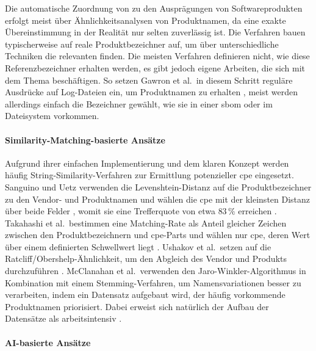 Die automatische Zuordnung von  zu den Ausprägungen von Softwareprodukten erfolgt meist über Ähnlichkeitsanalysen von Produktnamen, da eine exakte Übereinstimmung in der Realität nur selten zuverlässig ist.
Die Verfahren bauen typischerweise auf reale Produktbezeichner auf, um über unterschiedliche Techniken die relevanten  finden.
Die meisten Verfahren definieren nicht, wie diese Referenzbezeichner erhalten werden, es gibt jedoch eigene Arbeiten, die sich mit dem Thema beschäftigen.
So setzen Gawron et al.\ in diesem Schritt reguläre Ausdrücke auf Log-Dateien ein, um Produktnamen zu erhalten \autocite{Gawron2017}, meist werden allerdings einfach die Bezeichner gewählt, wie sie in einer \acrshort{sbom} oder im Dateisystem vorkommen.

\paragraph{Similarity-Matching-basierte Ansätze}

Aufgrund ihrer einfachen Implementierung und dem klaren Konzept werden häufig String-Similarity-Verfahren zur Ermittlung potenzieller \acrshort{cpe} eingesetzt.
Sanguino und Uetz verwenden die Levenshtein-Distanz auf die Produktbezeichner zu den Vendor- und Produktnamen und wählen die \acrshort{cpe} mit der kleinsten Distanz über beide Felder \autocite{Sanguino_Uetz_2017}, womit sie eine Trefferquote von etwa $83\,\%$ erreichen \autocite{Idrissi_Sebai_Faroukhi_Mahouachi_2024}.
Takahashi et al.\ bestimmen eine Matching-Rate als Anteil gleicher Zeichen zwischen den Produktbezeichnern und \acrshort{cpe}-Parts und wählen nur \acrshort{cpe}, deren Wert über einem definierten Schwellwert liegt \autocite{Takahashi_Miyamoto_Nakao_2016}.
Ushakov et al.\ setzen auf die Ratcliff/Obershelp-Ähnlichkeit, um den Abgleich des Vendor und Produkts durchzuführen \autocite{Ushakov_Doynikova_Novikova_Kotenko_2021}.
McClanahan et al.\ verwenden den Jaro-Winkler-Algorithmus in Kombination mit einem Stemming-Verfahren, um Namensvariationen besser zu verarbeiten, indem ein Datensatz aufgebaut wird, der häufig vorkommende Produktnamen priorisiert.
Dabei erweist sich natürlich der Aufbau der Datensätze als arbeitsintensiv \autocite{McClanahan_Li_2024}.

\paragraph{AI-basierte Ansätze}

